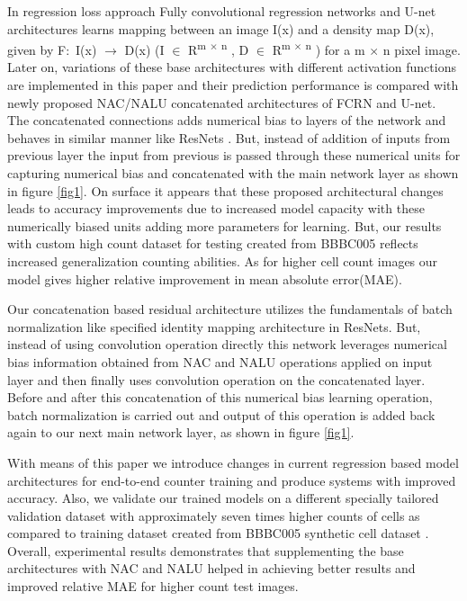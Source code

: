 \documentclass[runningheads]{llncs}
\begin{document}
In regression loss approach Fully convolutional regression networks \cite{b2} and U-net \cite{b8} architectures learns mapping  between an image I(x) and a density map D(x), given by F$\colon$ I(x) $\rightarrow$ D(x) (I $\in$ R\textsuperscript{m $\times$ n} , D $\in$ R\textsuperscript{m $\times$ n} ) for a m $\times$ n pixel image. Later on, variations of these base architectures with different activation functions are implemented in this paper and their prediction performance is compared with newly proposed NAC/NALU concatenated architectures of FCRN and U-net. The concatenated connections adds numerical bias to layers of the network and behaves in similar manner like ResNets \cite{b9}. But, instead of addition of inputs from previous layer the input from previous is passed through these numerical units for capturing numerical bias and concatenated with the main network layer as shown in figure \ref{fig1}. On surface it appears that these proposed architectural changes leads to accuracy improvements due to increased model capacity with these numerically biased units adding more parameters for learning. But, our results with custom high count dataset for testing created from BBBC005 \cite{b10} reflects increased generalization counting abilities. As for higher cell count images our model gives higher relative improvement in mean absolute error(MAE).

Our concatenation based residual architecture utilizes the fundamentals of batch normalization like specified identity mapping architecture \cite{b11} in ResNets. But, instead of using convolution operation directly this network leverages numerical bias information obtained from NAC and NALU operations applied on input layer and then finally uses convolution operation on the concatenated layer. Before and after this concatenation of this numerical bias learning operation, batch normalization is carried out and output of this operation is added back again to our next main network layer, as shown in figure  \ref{fig1}.

With means of this paper we introduce changes in current regression based model architectures for end-to-end counter training and produce systems with improved accuracy. Also, we validate our trained models on a different specially tailored validation dataset with approximately seven times higher counts of cells as compared to training dataset created from BBBC005 synthetic cell dataset \cite{b10}. Overall, experimental results demonstrates that supplementing the base architectures with NAC and NALU helped in achieving better results and improved relative MAE for higher count test images. 
\end{document}
